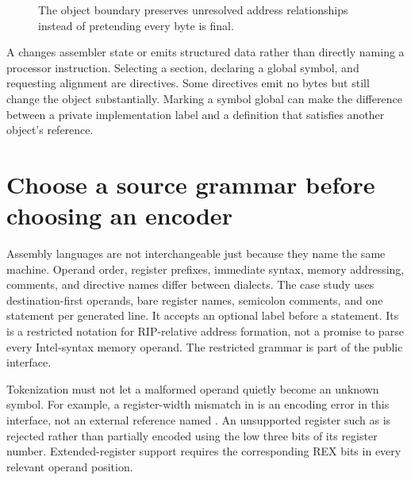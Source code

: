 \begin{figure}[htbp]
\centering
{}
\caption{The object boundary preserves unresolved address relationships instead of pretending every byte is final.}
\label{fig:ch53-contracts}
\end{figure}

A  changes assembler state or emits structured data rather than directly naming a processor instruction.
Selecting a section, declaring a global symbol, and requesting alignment are directives.
Some directives emit no bytes but still change the object substantially.
Marking a symbol global can make the difference between a private implementation label and a definition that satisfies another object's reference.

\section{Choose a source grammar before choosing an encoder}
\label{sec:ch53-syntax}

Assembly languages are not interchangeable just because they name the same machine.
Operand order, register prefixes, immediate syntax, memory addressing, comments, and directive names differ between dialects.
The case study uses destination-first operands, bare register names, semicolon comments, and one statement per generated line.
It accepts an optional label before a statement.
Its  is a restricted notation for RIP-relative address formation, not a promise to parse every Intel-syntax memory operand.
The restricted grammar is part of the public interface.

Tokenization must not let a malformed operand quietly become an unknown symbol.
For example, a register-width mismatch in  is an encoding error in this interface, not an external reference named .
An unsupported register such as  is rejected rather than partially encoded using the low three bits of its register number.
Extended-register support requires the corresponding REX bits in every relevant operand position.


